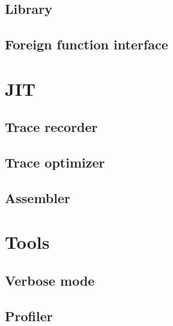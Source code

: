 \documentclass[12pt, oneside]{Thesis}
\begin{document}
    \section{Library}
    \label{Sec:Library}
    

    \section{Foreign function interface}
    \label{Sec:FFI}
    

  \chapter{JIT}
  \label{Chapt:JIT}

    \section{Trace recorder}
    \label{Sec:TR}
    

    \section{Trace optimizer}
    \label{Sec:TO}
    

    \section{Assembler}
    \label{Sec:TA}
    

  \chapter{Tools}
  \label{Chapt:Tools}

    \section{Verbose mode}
    \label{Sec:Verbose}
    

    \section{Profiler}
    \label{Sec:Profiler}
    
\end{document}
